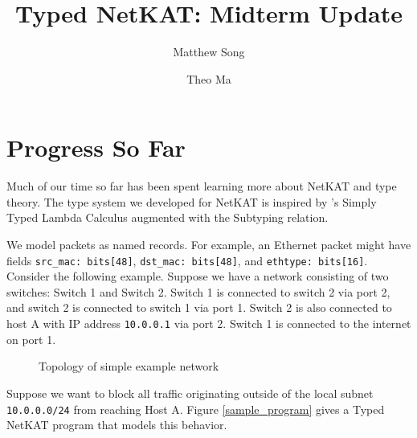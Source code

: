\documentclass[acmsmall,screen,nonacm]{acmart}
\begin{document}
\title{Typed NetKAT: Midterm Update}

\author{Matthew Song}

\author{Theo Ma}

\maketitle

\section{Progress So Far}
Much of our time so far has been spent learning more about NetKAT and
type theory. The type system we developed for NetKAT is inspired by
\citet{pierce2002}'s Simply Typed Lambda Calculus augmented with
the Subtyping relation.

We model packets as named records. For example, an Ethernet packet might
have fields \texttt{src\_mac: bits[48]}, \texttt{dst\_mac: bits[48]}, and 
\texttt{ethtype: bits[16]}. Consider the following example. Suppose we have
a network consisting of two switches: Switch 1 and Switch 2. Switch 1
is connected to switch 2 via port 2, and switch 2 is connected to switch 1
via port 1. Switch 2 is also connected to host A with IP address \texttt{10.0.0.1}
via port 2. Switch 1 is connected to the internet on port 1.

\begin{figure}[h]
  \caption{Topology of simple example network}
\end{figure}

Suppose we want to block all traffic originating outside of the local
subnet \texttt{10.0.0.0/24} from reaching Host A. Figure \ref{sample_program}
gives a Typed NetKAT program that models this behavior.
\end{document}
